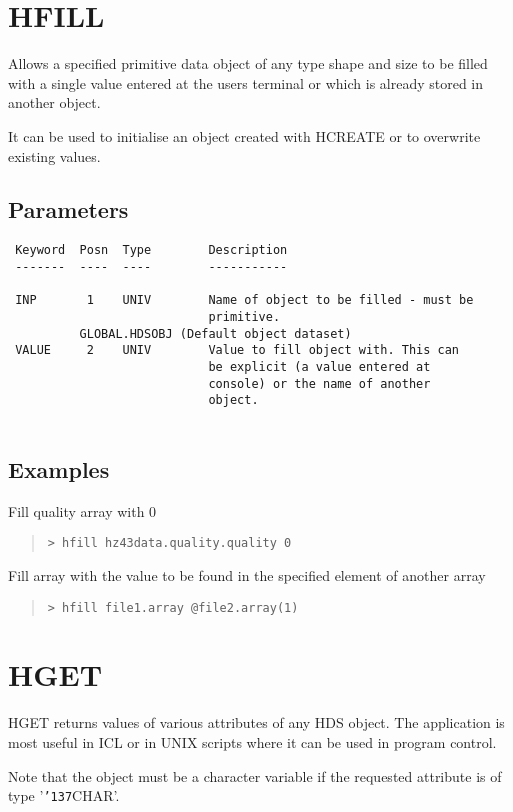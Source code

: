 \documentclass{book}
\renewcommand{\_}{{\tt\char'137}}     %
\begin{document}
\section{HFILL}
Allows a specified primitive data object of any type
shape and size to be filled with a single value entered at
the users terminal or which is already stored in another
object.
 
It can be used to initialise an object created with
HCREATE or to overwrite existing values.
 
\subsection{Parameters}
\begin{verbatim}
 Keyword  Posn  Type        Description
 -------  ----  ----        -----------
 
 INP       1    UNIV        Name of object to be filled - must be
                            primitive.
          GLOBAL.HDSOBJ (Default object dataset)
 VALUE     2    UNIV        Value to fill object with. This can
                            be explicit (a value entered at
                            console) or the name of another
                            object.
 
\end{verbatim}\subsection{Examples}
Fill quality array with 0
\begin{quote}\begin{verbatim}
> hfill hz43data.quality.quality 0
\end{verbatim}\end{quote}
Fill array with the value to be found in the specified
element of another array
\begin{quote}\begin{verbatim}
> hfill file1.array @file2.array(1)
\end{verbatim}\end{quote}
\section{HGET}
HGET returns values of various attributes of any HDS object. The
application is most useful in ICL or in UNIX scripts where it can
be used in program control.
 
Note that the object must be a character variable if the requested
attribute is of type '\_CHAR'.
 
\end{document}
